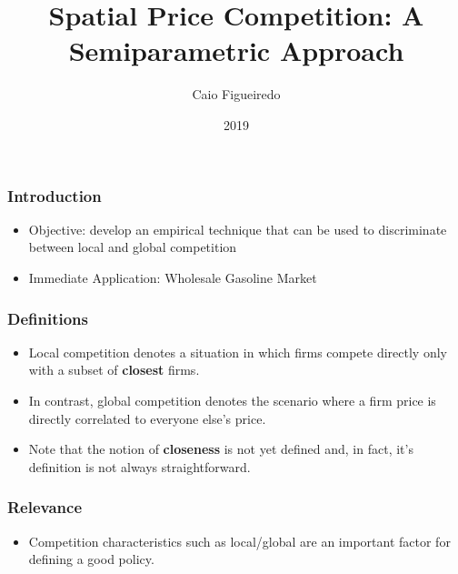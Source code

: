 \documentclass{beamer}
\title{Spatial Price Competition: A Semiparametric Approach}
\author{Caio Figueiredo}
\institute{Penn State}
\date{2019}
\begin{document}
 
\frame{\titlepage}
 
\begin{frame}
  \frametitle{Introduction}
  \begin{itemize}
    \item Objective: develop an empirical technique that can be used to discriminate between local and global competition
    \item Immediate Application: Wholesale Gasoline Market
  \end{itemize}

\end{frame}

\begin{frame}
  \frametitle{Definitions}

  \begin{itemize}
    \item Local competition denotes a situation in which firms compete directly only with a subset of \textbf{closest} firms.
    \item In contrast, global competition denotes the scenario where a firm price is directly correlated to everyone else's price.
    \item Note that the notion of \textbf{closeness} is not yet defined and, in fact, it's definition is not always straightforward.
  \end{itemize}
\end{frame}

\begin{frame}
  \frametitle{Relevance}
  
  \begin{itemize}
    \item Competition characteristics such as  local/global are an important factor for defining a good policy.
  \end{itemize}

\end{frame}
\end{document}

